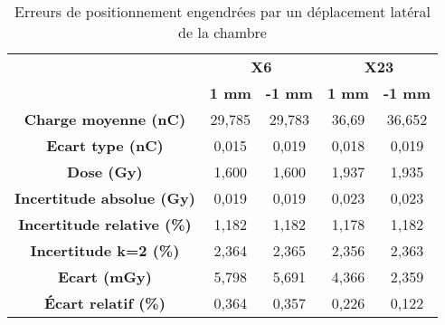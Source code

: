 \documentclass{article}
\begin{document}
\begin{table}[h]
  \centering
  \begin{tabular}{c|cc|cc|}
  \cline{2-5}
  \textbf{} & \multicolumn{2}{c|}{\textbf{X6}} & \multicolumn{2}{c|}{\textbf{X23}} \\ \cline{2-5} 
  \textbf{} & \textbf{1 mm} & \textbf{-1 mm} & \textbf{1 mm} & \textbf{-1 mm} \\ \hline
  \multicolumn{1}{|c|}{\textbf{Charge moyenne   (nC)}} & 29,785 & 29,783 & 36,69 & 36,652 \\
  \multicolumn{1}{|c|}{\textbf{Ecart type (nC)}} & 0,015 & 0,019 & 0,018 & 0,019 \\ \hline
  \multicolumn{1}{|c|}{\textbf{Dose (Gy)}} & 1,600 & 1,600 & 1,937 & 1,935 \\
  \multicolumn{1}{|c|}{\textbf{Incertitude absolue (Gy)}} & 0,019 & 0,019 & 0,023 & 0,023 \\
  \multicolumn{1}{|c|}{\textbf{Incertitude relative (\%)}} & 1,182 & 1,182 & 1,178 & 1,182 \\
  \multicolumn{1}{|c|}{\textbf{Incertitude k=2 (\%)}} & 2,364 & 2,365 & 2,356 & 2,363 \\
  \multicolumn{1}{|c|}{\textbf{Ecart (mGy)}} & 5,798 & 5,691 & 4,366 & 2,359 \\
  \multicolumn{1}{|c|}{\textbf{Écart relatif (\%)}} & 0,364 & 0,357 & 0,226 & 0,122 \\ \hline
  \end{tabular}
  \caption{Erreurs de positionnement engendrées par un déplacement latéral de la chambre}
  \label{table_erreur_lat}
\end{table}
\end{document}
